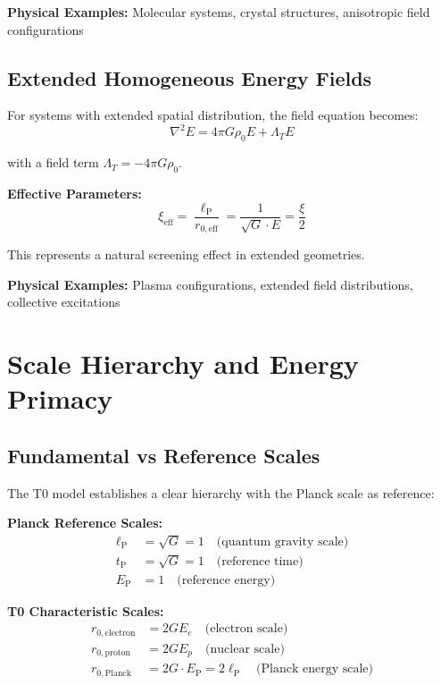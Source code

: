 \documentclass[12pt,a4paper]{report}
\newcommand{\EP}{E_{\text{P}}}            %
\newcommand{\lP}{\ell_{\text{P}}}         %
\newcommand{\tP}{t_{\text{P}}}            %
\newcommand{\Lambdat}{\Lambda_T}          %
\begin{document}
	\textbf{Physical Examples:} Molecular systems, crystal structures, anisotropic field configurations
	
	\subsection{Extended Homogeneous Energy Fields}\label{subsec:extended_homogeneous}
	
	For systems with extended spatial distribution, the field equation becomes:
	\begin{equation}
		\nabla^2 E = 4\pi G \rho_0 E + \Lambdat E
		\label{eq:field_equation_extended}
	\end{equation}
	
	with a field term $\Lambdat = -4\pi G \rho_0$.
	
	\textbf{Effective Parameters:}
	\begin{equation}
		\xi_{\text{eff}} = \frac{\lP}{r_{0,\text{eff}}} = \frac{1}{\sqrt{G} \cdot E} = \frac{\xi}{2}
		\label{eq:xi_effective}
	\end{equation}
	
	This represents a natural screening effect in extended geometries.
	
	\textbf{Physical Examples:} Plasma configurations, extended field distributions, collective excitations
	
	\section{Scale Hierarchy and Energy Primacy}\label{sec:scale_hierarchy}
	
	\subsection{Fundamental vs Reference Scales}\label{subsec:fundamental_vs_reference}
	
	The T0 model establishes a clear hierarchy with the Planck scale as reference:
	
	\textbf{Planck Reference Scales:}
	\begin{align}
		\lP &= \sqrt{G} = 1 \quad \text{(quantum gravity scale)} \\
		\tP &= \sqrt{G} = 1 \quad \text{(reference time)} \\
		\EP &= 1 \quad \text{(reference energy)}
	\end{align}
	
	\textbf{T0 Characteristic Scales:}
	\begin{align}
		r_{0,\text{electron}} &= 2GE_e \quad \text{(electron scale)} \\
		r_{0,\text{proton}} &= 2GE_p \quad \text{(nuclear scale)} \\
		r_{0,\text{Planck}} &= 2G \cdot \EP = 2\lP \quad \text{(Planck energy scale)}
	\end{align}
	
\end{document}
